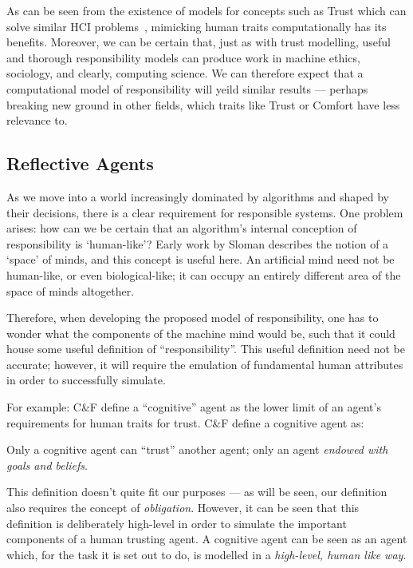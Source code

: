As can be seen from the existence of models for concepts such as Trust which can solve similar HCI problems~\cite{designing_with_trust}, mimicking human traits computationally has its benefits. Moreover, we can be certain that, just as with trust modelling, useful and thorough responsibility models can produce work in machine ethics\cite{Moor2006}, sociology\cite{Macy2002}, and clearly, computing science. We can therefore expect that a computational model of responsibility will yeild similar results --- perhaps breaking new ground in other fields, which traits like Trust or Comfort have less relevance to.\par

\subsection{Reflective Agents}

As we move into a world increasingly dominated by algorithms and shaped by their decisions, there is a clear requirement for responsible systems. One problem arises: how can we be certain that an algorithm's internal conception of responsibility is `human-like'? Early work by Sloman describes the notion of a `space' of minds\cite{Sloman1984TheMinds}, and this concept is useful here. An artificial mind need not be human-like, or even biological-like; it can occupy an entirely different area of the space of minds altogether. \par

Therefore, when developing the proposed model of responsibility, one has to wonder what the components of the machine mind would be, such that it could house some useful definition of ``responsibility''. This useful definition need not be accurate; however, it will require the emulation of fundamental human attributes in order to successfully simulate.\par

For example: C\&F define a ``cognitive'' agent as the lower limit of an agent's requirements for human traits for trust. C\&F define a cognitive agent as:
\begin{displayquote}
    Only a cognitive agent can ``trust'' another agent; only an agent \emph{endowed with goals and beliefs}.
\end{displayquote}\par

This definition doesn't quite fit our purposes --- as will be seen, our definition also requires the concept of \emph{obligation}. However, it can be seen that this definition is deliberately high-level in order to simulate the important components of a human trusting agent. A cognitive agent can be seen as an agent which, for the task it is set out to do, is modelled in a \emph{high-level, human like way}. \par

